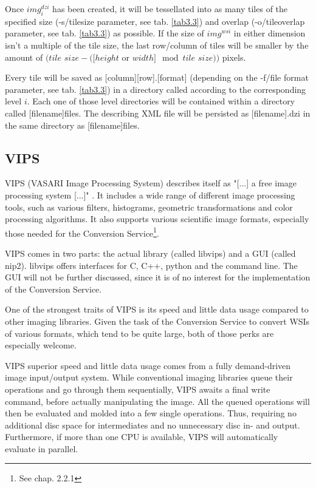 Once $img^{dzi}_i$ has been created, it will be tessellated into as many tiles of the specified size (-s/tile{\textunderscore}size parameter, see tab. \ref{tab3.3}) and overlap (-o/tile{\textunderscore}overlap parameter, see tab. \ref{tab3.3}) as possible. If the size of $img^{wsi}$ in either dimension isn't a multiple of the tile size, the last row/column of tiles will be smaller by the amount of $(tile$ $size - ([height$ or $width] \mod tile$ $size))$ pixels.

Every tile will be saved as [column]{\textunderscore}[row].[format] (depending on the -f/file{\textunderscore} format parameter, see tab. \ref{tab3.3}) in a directory called according to the corresponding level $i$. Each one of those level directories will be contained within a directory called [filename]{\textunderscore}files. The describing XML file will be persisted as [filename].dzi in the same directory as [filename]{\textunderscore}files.


\subsection{VIPS}

VIPS (VASARI Image Processing System) describes itself as "[...] a free image processing system [...]" \cite{web:vips}. It includes a wide range of different image processing tools, such as various filters, histograms, geometric transformations and color processing algorithms. It also supports various scientific image formats, especially those needed for the Conversion Service\footnote{See chap. 2.2.1}\cite{web:vips}.

VIPS comes in two parts: the actual library (called libvips) and a GUI (called nip2). libvips offers interfaces for C, C++, python and the command line. The GUI will not be further discussed, since it is of no interest for the implementation of the Conversion Service.

One of the strongest traits of VIPS is its speed and little data usage compared to other imaging libraries\cite{cupitt05}. Given the task of the Conversion Service to convert WSIs of various formats, which tend to be quite large, both of those perks are especially welcome.

VIPS superior speed and little data usage comes from a fully demand-driven image input/output system. While conventional imaging libraries queue their operations and go through them sequentially, VIPS awaits a final write command, before actually manipulating the image. All the queued operations will then be evaluated and molded into a few single operations. Thus, requiring no additional disc space for intermediates and no unnecessary disc in- and output. Furthermore, if more than one CPU is available, VIPS will automatically evaluate in parallel\cite{cupitt96}.

